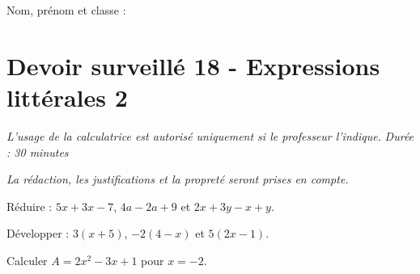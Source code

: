 \documentclass[a4paper,10pt]{report}
\begin{document}
\pagestyle{empty}
\noindent Nom, prénom et classe : \dotfill

\section*{Devoir surveillé 18 - Expressions littérales 2}

\noindent \textit{L'usage de la calculatrice est autorisé uniquement si le professeur l'indique.} \hfill \textit{Durée : 30 minutes}

\medskip
\noindent \textit{La rédaction, les justifications et la propreté seront prises en compte.}


\begin{ex}[Réduire]
Réduire : $5x+3x-7$, $4a-2a+9$ et $2x+3y-x+y$.
\medskip\noindent\grandscarreaux{\linewidth}{3cm}
\end{ex}
\begin{ex}[Développer]
Développer : $3(x+5)$, $-2(4-x)$ et $5(2x-1)$.
\medskip\noindent\grandscarreaux{\linewidth}{4cm}
\end{ex}
\begin{ex}[Substituer]
Calculer $A=2x^2-3x+1$ pour $x=-2$.
\medskip\noindent\grandscarreaux{\linewidth}{3cm}
\end{ex}
\end{document}
